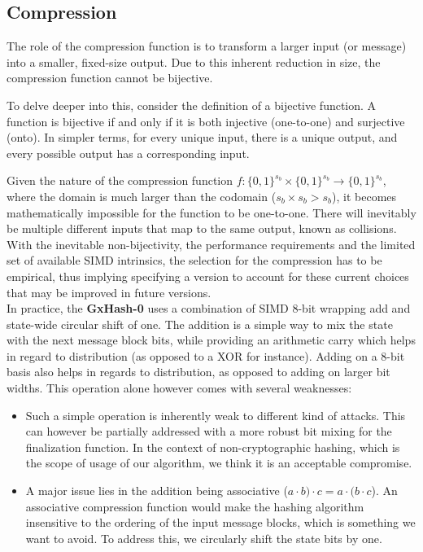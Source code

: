 \documentclass[10pt]{article}
\begin{document}
\subsection{Compression}

The role of the compression function is to transform a larger input (or message) into a smaller, fixed-size output. Due to this inherent reduction in size, the compression function cannot be bijective.

To delve deeper into this, consider the definition of a bijective function. A function is bijective if and only if it is both injective (one-to-one) and surjective (onto). In simpler terms, for every unique input, there is a unique output, and every possible output has a corresponding input.

Given the nature of the compression function \( f: \{0,1\}^{s_b} \times \{0,1\}^{s_b} \to \{0,1\}^{s_b} \), where the domain is much larger than the codomain (\( s_b \times s_b > s_b \)), it becomes mathematically impossible for the function to be one-to-one. There will inevitably be multiple different inputs that map to the same output, known as collisions.\\

With the inevitable non-bijectivity, the performance requirements and the limited set of available SIMD intrinsics, the selection for the compression has to be empirical, thus implying specifying a version to account for these current choices that may be improved in future versions.\\

In practice, the \textbf{GxHash-0} uses a combination of SIMD 8-bit wrapping add and state-wide circular shift of one. The addition is a simple way to mix the state with the next message block bits, while providing an arithmetic carry which helps in regard to distribution (as opposed to a XOR for instance). Adding on a 8-bit basis also helps in regards to distribution, as opposed to adding on larger bit widths. This operation alone however comes with several weaknesses:
\begin{itemize}
\item Such a simple operation is inherently weak to different kind of attacks. This can however be partially addressed with a more robust bit mixing for the finalization function. In the context of non-cryptographic hashing, which is the scope of usage of our algorithm, we think it is an acceptable compromise.
\item A major issue lies in the addition being associative (\(a \cdot b) \cdot c = a \cdot (b \cdot c \)). An associative compression function would make the hashing algorithm insensitive to the ordering of the input message blocks, which is something we want to avoid. To address this, we circularly shift the state bits by one.
\end{itemize}
\end{document}
